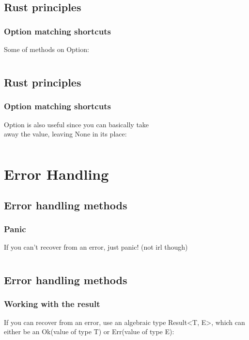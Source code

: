 \documentclass[usenames,twocolumn,dvipsnames,10pt,a4wide]{article}
\begin{document}
\inputminted[fontsize=\normalsize]{rust}{code/option5.rs}

\subsection{Rust principles}
\subsubsection{Option matching shortcuts}
Some of methods on Option:
\inputminted[fontsize=\normalsize]{rust}{code/option6.rs}

\subsection{Rust principles}
\subsubsection{Option matching shortcuts}
Option is also useful since you can basically take\\
away the value, leaving None in its place:\\
\inputminted[fontsize=\normalsize]{rust}{code/option7.rs}


\section{Error Handling}

\subsection{Error handling methods}
	\subsubsection{Panic}
If you can't recover from an error, just panic!
(not irl though)

\inputminted[fontsize=\normalsize]{rust}{code/error1.rs}
\normalsize


\subsection{Error handling methods}
\subsubsection{Working with the result}

\normalsize
If you can recover from an error, use an algebraic
type Result<T, E>, which can either be an
Ok(value of type T) or 
Err(value of type E):
\end{document}
